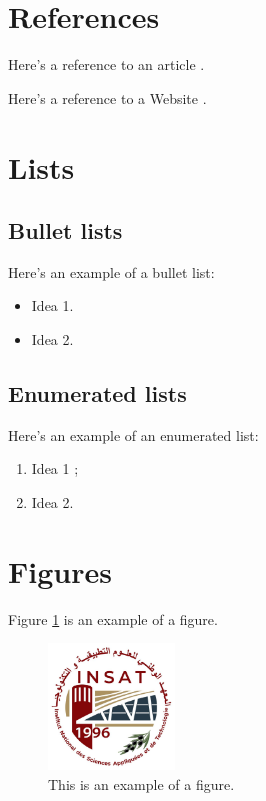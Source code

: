 
\section{References}
Here's a reference to an article \cite{universalFER}.

Here's a reference to a Website \cite{insat}.

\section{Lists}
\subsection{Bullet lists}
Here's an example of a bullet list:
\begin{itemize}
\item Idea 1.
\item Idea 2.
\end{itemize}
\medskip \par

\subsection{Enumerated lists}
Here's an example of an enumerated list:
\begin{enumerate}
\item Idea 1 ;
\item Idea 2.
\end{enumerate}
\medskip \par

\section{Figures}
Figure \ref{fig:exemple1} is an example of a figure.
\begin{figure}[!h]
\centering
\includegraphics[width=0.3\textwidth]{images/INSAT.jpg}
\caption{This is an example of a figure.}
\label{fig:exemple1}
\end{figure}

